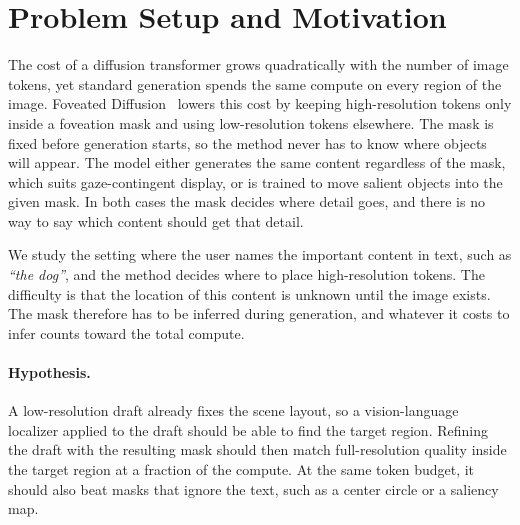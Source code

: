 \documentclass[11pt]{article}
\begin{document}
\section{Problem Setup and Motivation}

The cost of a diffusion transformer grows quadratically with the number of image tokens, yet standard generation spends the same compute on every region of the image. Foveated Diffusion~\cite{chao2026foveated} lowers this cost by keeping high-resolution tokens only inside a foveation mask and using low-resolution tokens elsewhere. The mask is fixed before generation starts, so the method never has to know where objects will appear. The model either generates the same content regardless of the mask, which suits gaze-contingent display, or is trained to move salient objects into the given mask. In both cases the mask decides where detail goes, and there is no way to say which content should get that detail.

We study the setting where the user names the important content in text, such as \textit{``the dog''}, and the method decides where to place high-resolution tokens. The difficulty is that the location of this content is unknown until the image exists. The mask therefore has to be inferred during generation, and whatever it costs to infer counts toward the total compute.

\paragraph{Hypothesis.}
A low-resolution draft already fixes the scene layout, so a vision-language localizer applied to the draft should be able to find the target region. Refining the draft with the resulting mask should then match full-resolution quality inside the target region at a fraction of the compute. At the same token budget, it should also beat masks that ignore the text, such as a center circle or a saliency map.



\end{document}
